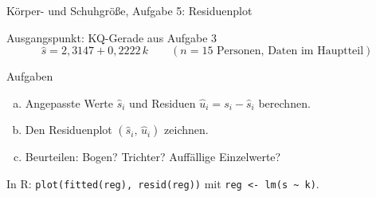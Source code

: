 \documentclass[aspectratio=169,11pt]{beamer}
\begin{document}
\begin{frame}[fragile]{Körper- und Schuhgröße, Aufgabe 5: Residuenplot}
  \begin{block}{Ausgangspunkt: KQ-Gerade aus Aufgabe 3}
    \[ \hat{s} = 2{,}3147 + 0{,}2222\,k \qquad (n = 15 \text{ Personen, Daten im Hauptteil}) \]
  \end{block}

  \medskip

  \begin{exampleblock}{Aufgaben}
    \begin{enumerate}[a)]
      \setlength{\itemsep}{2pt}
      \item Angepasste Werte $\hat{s}_i$ und Residuen $\hat{u}_i = s_i - \hat{s}_i$ berechnen.
      \item Den Residuenplot $(\hat{s}_i,\,\hat{u}_i)$ zeichnen.
      \item Beurteilen: Bogen? Trichter? Auffällige Einzelwerte?
    \end{enumerate}
  \end{exampleblock}

  \footnotesize In R: \lstinline[basicstyle=\ttfamily\footnotesize]|plot(fitted(reg), resid(reg))| mit \lstinline[basicstyle=\ttfamily\footnotesize]|reg <- lm(s ~ k)|.
\end{frame}
\end{document}
